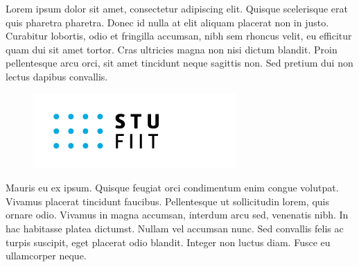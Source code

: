 \documentclass[10pt,twocolumn,twoside,slovak,a4paper]{article}
\begin{document}
\clearpage
\clearpage


Lorem ipsum dolor sit amet, consectetur adipiscing elit. Quisque scelerisque erat quis pharetra pharetra. Donec id nulla at elit aliquam placerat non in justo. Curabitur lobortis, odio et fringilla accumsan, nibh sem rhoncus velit, eu efficitur quam dui sit amet tortor. Cras ultricies magna non nisi dictum blandit. Proin pellentesque arcu orci, sit amet tincidunt neque sagittis non. Sed pretium dui non lectus dapibus convallis.
\begin{figure}
    \includegraphics[width=\linewidth]{STU-FIIT-zfv.png}
\end{figure}
Mauris eu ex ipsum. Quisque feugiat orci condimentum enim congue volutpat. Vivamus placerat tincidunt faucibus. Pellentesque ut sollicitudin lorem, quis ornare odio. Vivamus in magna accumsan, interdum arcu sed, venenatis nibh. In hac habitasse platea dictumst. Nullam vel accumsan nunc. Sed convallis felis ac turpis suscipit, eget placerat odio blandit. Integer non luctus diam. Fusce eu ullamcorper neque.
\end{document}
